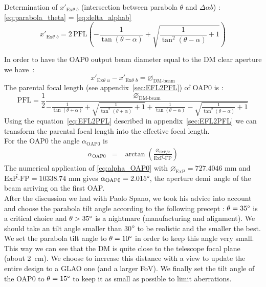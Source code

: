 \documentclass[12pt,a4paper]{article}
\begin{document}
Determination of $x'_{\text{Ex}\theta\,\,b}$ (intersection between parabola $\theta$ and $\Delta\alpha b$) :\\ \eqref{eq:parabola_theta} = \eqref{eq:delta_alphab}\\
\begin{equation}
	x'_{\text{Ex}\theta\,\,b} = 2\,\text{PFL}\left(-\frac{1}{\tan\left(\theta-\alpha\right)}+\sqrt{\frac{1}{\tan^2\left(\theta-\alpha\right)}+1}\right)
\end{equation}

In order to have the OAP0 output beam diameter equal to the DM clear aperture we have~:
\begin{equation}
	x'_{\text{Ex}\theta\,\,u}-x'_{\text{Ex}\theta\,\,b} = \diameter_\text{DM-beam}
\end{equation}
The parental focal length (see appendix~\ref{sec:EFL2PFL}) of OAP0 is :
\begin{equation}
	\text{PFL} = \frac{1}{2}\frac{\diameter_\text{DM-beam}}{-\frac{1}{\tan\left(\theta+\alpha\right)}+\sqrt{\frac{1}{\tan^2\left(\theta+\alpha\right)}+1}+\frac{1}{\tan\left(\theta-\alpha\right)}-\sqrt{\frac{1}{\tan^2\left(\theta-\alpha\right)}+1}}
\end{equation}
Using the equation~\eqref{eq:EFL2PFL} described in appendix~\ref{sec:EFL2PFL} we can transform the parental focal length into the effective focal length.\\

For the OAP0 the angle $\alpha_{\text{OAP0}}$ is
\begin{eqnarray}\label{eq:alpha_OAP0}
	\alpha_{\text{OAP0}} &= &\arctan\left(\frac{\diameter_{\text{ExP}/2}}{\overline{\text{ExP-FP}}}\right)
\end{eqnarray} 
The numerical application of \eqref{eq:alpha_OAP0} with $\diameter_{\text{ExP}} = 727.4046$ mm and $\overline{\text{ExP-FP}} = 10338.74$ mm gives $\alpha_{\text{OAP0}}  = 2.015\degree$, the aperture demi~angle of the beam arriving on the first OAP.\\

After the discussion we had with Paolo Spano, we took his advice into account and choose the parabola tilt angle according to the following precept : $\theta= 35\degree$ is a critical choice and $\theta > 35\degree$ is a nightmare (manufacturing and alignment). We should take an tilt angle smaller than 30$\degree$ to be realistic and the smaller the best.\\

We set the parabola tilt angle to $\theta = 10\degree$ in order to keep this angle very small. This way we can see that the DM is quite close to the telescope focal plane (about 2~cm). We choose to increase this distance with a view to update the entire design to a GLAO one (and a larger FoV). We finally set the tilt angle of the OAP0 to $\theta = 15\degree$ to keep it as small as possible to limit aberrations.\\
\end{document}
